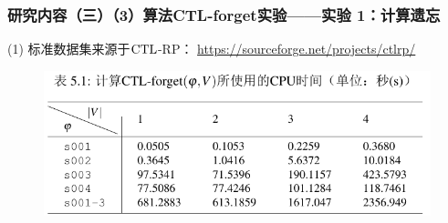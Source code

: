 \documentclass[9pt, CJK]{beamer}
\begin{document}
\begin{frame}
	\frametitle{研究内容（三）（3）算法CTL-forget实验——{\footnotesize 实验 1：计算遗忘}}
	{\footnotesize
		(1)	标准数据集来源于$\textrm{CTL}$-RP： \url{https://sourceforge.net/projects/ctlrp/}
		\begin{figure}
			\includegraphics[scale=0.35]{figures/expTab}
		\end{figure}

}
\end{frame}
\end{document}
